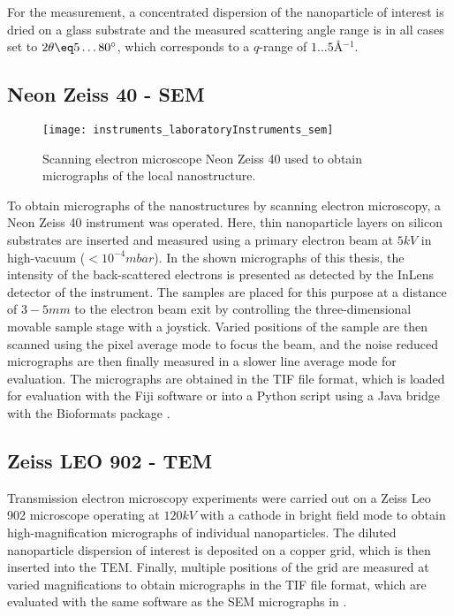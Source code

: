 \documentclass[\main/dresen_thesis.tex]{subfiles}
\begin{document}
    For the measurement, a concentrated dispersion of the nanoparticle of interest is dried on a glass substrate and the measured scattering angle range is in all cases set to $2 \theta \eq 5 \ldots 80^\circ$, which corresponds to a $q$-range of $1 \ldots 5 \unit{\angstrom^{-1}}$.


  \subsection{Neon Zeiss 40 - SEM}
    \label{ch:instruments:laboratoryInstruments:sem}
    \begin{figure}[ht]
      \centering
      \texttt{[image: instruments\_laboratoryInstruments\_sem]}
      \caption{\label{fig:appendix:instruments:sem}Scanning electron microscope Neon Zeiss 40 used to obtain micrographs of the local nanostructure.}
    \end{figure}
    To obtain micrographs of the nanostructures by scanning electron microscopy, a Neon Zeiss 40 instrument was operated.
    Here, thin nanoparticle layers on silicon substrates are inserted and measured using a primary electron beam at $5 \unit{kV}$ in high-vacuum ($< 10^{-4} \unit{mbar}$).
    In the shown micrographs of this thesis, the intensity of the back-scattered electrons is presented as detected by the InLens detector of the instrument.
    The samples are placed for this purpose at a distance of $3 - 5 \unit{mm}$ to the electron beam exit by controlling the three-dimensional movable sample stage with a joystick.
    Varied positions of the sample are then scanned using the pixel average mode to focus the beam, and the noise reduced micrographs are then finally measured in a slower line average mode for evaluation.
    The micrographs are obtained in the TIF file format, which is loaded for evaluation with the Fiji software \cite{Schindelin_2012_Fijia} or into a Python script using a Java bridge with the Bioformats package \cite{Linkert_2010_Metad}.

  \subsection{Zeiss LEO 902 - TEM}
    \label{ch:instruments:laboratoryInstruments:tem}
    Transmission electron microscopy experiments were carried out on a Zeiss Leo 902 microscope operating at $120 \unit{kV}$ with a  cathode in bright field mode to obtain high-magnification micrographs of individual nanoparticles.
    The diluted nanoparticle dispersion of interest is deposited on a copper grid, which is then inserted into the TEM.
    Finally, multiple positions of the grid are measured at varied magnifications to obtain micrographs in the TIF file format, which are evaluated with the same software as the SEM micrographs in .
\end{document}
